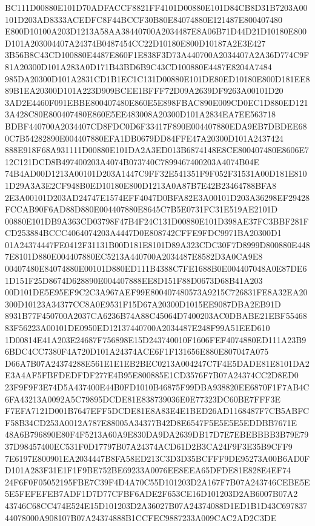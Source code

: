 \documentclass[UTF8,fontset=fandol,zihao=-4,a4paper]{ctexart}
\begin{document}
{{BC111D00880E101D70ADFACCF8821FF4101D00880E101D84CB8D31B7203A00101D203AD8333ACEDFC8F44BCCF30B80E84074880E121487E800407480
E800D10100A203D1213A58AA38440700A2034487E8A06B71D44D21D10180E800D101A203004407A24374B0487454CC22D10180E800D10187A2E3E427
3B56B8C43CD100880E4487E860F1E838F3D73A440700A2034407A2A36D774C9F81A20300D101A283A0D171B43BD6B9C43CD100880E4487E8204A7484
985DA20300D101A2831CD1B1EC1C131D00880E101DE80ED10180E800D181EE889B1EA20300D101A223D909BCEE1BFFF72D09A2639DF9263A00101D20
3AD2E4460F091EBBE800407480E860E5E898FBAC890E009CD0EC1D880ED1213A428C80E800407480E860E5EE483008A20300D101A2834EA7EE563718
BDBF440700A2034407CD8FDC0D6F33417F890E004407880EDA9EB7DBDEE680C7B54282890E004407880EFA1DB0679DD84FFE47A20300D101A2437424
888E918F68A931111D00880E101DA2A3ED013B6874148E8CE800407480E8606E712C121DCD8B497400203A4074B073740C7899467400203A4074B04E
74B4AD00D1213A00101D203A1447C9FF32E541351F9F052F31531A00D181E8101D29A3A3E2CF948B0ED10180E800D1213A0A87B7E42B23464788BFA8
2E3A00101D203AD24747E1574EFF4047D0BFA82E3A00101D203A36298EF29428FCCAB90F6AD88D880E004407880E8645C7B5E0731FC31E519AE2101D
00880E101DB9A363CD03798F47B4F24C131D00880E101D398AE37FC3BBF281FCD253884BCCC4064074203A4447D0E808742CFFE9FDC9971BA20300D1
01A24374447FE0412F31131B00D181E8101D89A323CDC30F7D8999D800880E4487E8101D880E004407880EC5213A440700A2034487E8582D3A0CA9E8
00407480E84074880E00101D880ED111B4388C7FE1688B0E004407048A0E87DE61D151F25D8674D628890E004407888EE8D151F88D0673D68B41A203
00D101DE5E95EF9C2C3A967AEF99E800407480573A9215C726831FE8A32EA20300D10123A34377CC8A0E9531F15D67A20300D1015EE9087DBA2EB91D
8931B77F450700A2037CA6236B74A88C45064D7400203AC0DBABE21EBF5546883F56223A00101DE0950ED12137440700A2034487E248F99A51EED610
1D00814E41A203E24687F756898E15D243740010F1606FEF4074880ED111A23B96BDC4CC7380F4A720D101A24374ACE6F1F131656E880E807047A075
D66A7B07A24374288E561E1E1EB2BEC0213A004247C7F4E5DADE81E8101DA2E3A4AF5FBFDEDFDF277E4B95E800885E1CD3576F7B07A24374CC2D8ED0
23F9F9F3E74D5A437400E44B0FD1010B46875F99DBA938820EE6870F1F7AB4C6FA43213A0092A5C79895DCDE81E838739036E0E77323DC60BE7FFF3E
F7EFA7121D001B7647EFF5DCDE81E8A83E4E1BED26AD1168487F7CB5ABFCF58B34CD253A0012A787E88005A34377B42D8E6547F5E5E5E5EDDBB7671E
48A6B796890E80F4F5213A60A9E830DA9DA2639DB17D7E7EBEBBBB3B79E7937D98457400EC531F0D17797B07A24374ACD61D2B3CA24F9F3E35B9CFF9
7E6197E800901EA2034447B8FA58ED213C3D3D35BCFFF9DE95273A00B6AD0FD101A283F31E1F1F9BE752BE69233A0076EE8EEA65DFDE81E828E4EF74
24F6F0F05052195FBE7C39F4D4A70C55D101203D2A167F7B07A243746CEBE5E5E5FEFEFEB7ADF1D7D77CFBF6ADE2F653CE16D101203D2AB6007B07A2
43746C68CC474E524E15D101203D2A36027B07A24374088D1ED1B1D43C69783744078000A908107B07A24374888B1CCFEC9887233A009CAC2AD2C3DE
}}
\end{document}
